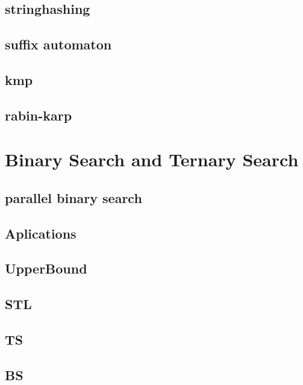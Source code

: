 \subsection{stringhashing}
\raggedbottom
\hrulefill
\subsection{suffix automaton}
\raggedbottom
\hrulefill
\subsection{kmp}
\raggedbottom
\hrulefill
\subsection{rabin-karp}
\raggedbottom
\hrulefill

\section{Binary Search and Ternary Search}
\subsection{parallel binary search}
\raggedbottom
\hrulefill
\subsection{Aplications}
\raggedbottom
\hrulefill
\subsection{UpperBound}
\raggedbottom
\hrulefill
\subsection{STL}
\raggedbottom
\hrulefill
\subsection{TS}
\raggedbottom
\hrulefill
\subsection{BS}
\raggedbottom
\hrulefill
